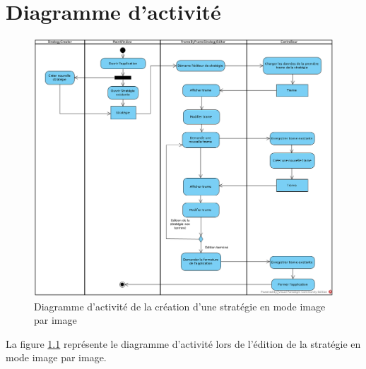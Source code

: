 
\chapter{Diagramme d'activité}
\label{s:diagramme_activite}

\begin{figure}[htpb]
    \centering
    \includegraphics[scale=0.60]{fig/activity_diagram_imagepimage.png}
    \caption{Diagramme d'activité de la création d'une stratégie en mode image par image}
    \label{fig:activity_diagram_imagepimage}
\end{figure}

La figure \ref{fig:activity_diagram_imagepimage} représente le diagramme d'activité lors de l'édition de la stratégie en mode image par image.

